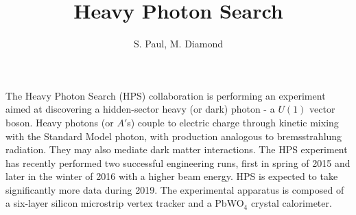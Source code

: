 \documentclass[b1]{sciposter}
\title{Heavy Photon Search}
\author{S. Paul, M. Diamond}
\institute{College of William and Mary, SLAC National Accelerator Laboratory}
\begin{document}
\maketitle

{The Heavy Photon Search (HPS) collaboration is performing an experiment aimed at discovering a hidden-sector heavy (or dark) photon - a $U(1)$ vector boson. Heavy photons (or $A'$s) couple to electric charge through kinetic mixing with the Standard Model photon, with production analogous to bremsstrahlung radiation. They may also mediate dark matter interactions. The HPS experiment has recently performed two successful engineering runs, first in spring of 2015 and later in the winter of 2016 with a higher beam energy. HPS is expected to take significantly more data during 2019. The experimental apparatus is composed of a six-layer silicon microstrip vertex tracker and a PbWO$_4$ crystal calorimeter. 
}
\end{document}
